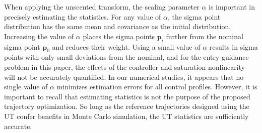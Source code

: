 \documentclass[journal ]{new-aiaa}
\newcommand{\param}{\ensuremath{\mathbf{p}}}
\begin{document}
When applying the unscented transform, the scaling parameter $\alpha$ is important in precisely estimating the statistics. For any value of $\alpha$, the sigma point distribution has the same mean and covariance as the initial distribution. Increasing the value of $\alpha$ places the sigma points $\param_i$ further from the nominal sigma point $\param_0$ and reduces their weight. Using a small value of $\alpha$ results in sigma points with only small deviations from the nominal, and for the entry guidance problem in this paper, the effects of the controller and saturation nonlinearity will not be accurately quantified. In our numerical studies, it appears that no single value of $\alpha$ minimizes estimation errors for all control profiles. However, it is important to recall that estimating statistics is not the purpose of the proposed trajectory optimization. So long as the reference trajectories designed using the UT confer benefits in Monte Carlo simulation, the UT statistics are sufficiently accurate. 
\end{document}
